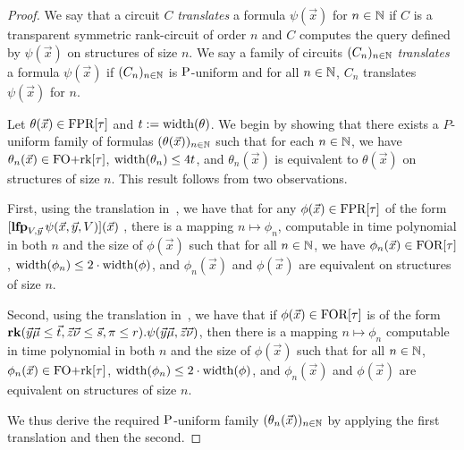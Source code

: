 \documentclass[../paper.tex]{subfiles}
\begin{document}
\begin{proof}
  We say that a circuit $C$ \emph{translates} a formula $\psi(\vec{x})$ for $n
  \in \mathbb{N}$ if $C$ is a transparent symmetric rank-circuit of order $n$ and $C$
  computes the query defined by $\psi(\vec{x})$ on structures of size $n$. We
  say a family of circuits $(C_n)_{n \in \mathbb{N}}$ \emph{translates} a formula
  $\psi (\vec{x})$ if $(C_n)_{n \in \mathbb{N}}$ is $\mathrm{P}$-uniform and for all $n \in
  \mathbb{N}$, $C_n$ translates $\psi(\vec{x})$ for $n$.

  
  Let $\theta(\vec{x}) \in \text{\upshape FPR}[\tau]$ and $t := \mathrm{width} (\theta)$. We begin by
  showing that there exists a $P$-uniform family of formulas
  $(\theta(\vec{x}))_{n \in \mathbb{N}}$ such that for each $n \in \mathbb{N}$, we have
  $\theta_n(\vec{x}) \in \text{\upshape FO+rk}[\tau]$, $\mathrm{width}(\theta_n) \leq 4 t$, and
  $\theta_n(\vec{x})$ is equivalent to $\theta(\vec{x})$ on structures of size
  $n$. This result follows from two observations.

  First, using the translation in~\cite{Dawar09logicswith}, we have that for any
  $\phi(\vec{x}) \in \text{\upshape FPR}[\tau]$ of the form $[\text{\textbf{lfp}}_{V, \vec{y}} \, \psi(\vec{x},
    \vec{y}, V) ](\vec{x})$ , there is a mapping $n \mapsto \phi_n$, computable
  in time polynomial in both $n$ and the size of $\phi(\vec{x})$ such that for
  all $n \in \mathbb{N}$, we have $\phi_n(\vec{x}) \in \text{\upshape FOR}[\tau]$, $\mathrm{width} (\phi_n)
  \leq 2 \cdot \mathrm{width} (\phi)$, and $\phi_n(\vec{x})$ and $\phi(\vec{x})$ are
  equivalent on structures of size $n$.

  Second, using the translation in~\cite{libkin2004elements}, we have that if
  $\phi (\vec{x}) \in \text{\upshape FOR}[\tau]$ is of the form $\text{\textbf{rk}} (\vec{y}\vec{\mu} \leq
  \vec{t}, \vec{z}\vec{\nu} \leq \vec{s}, \pi \leq r) . \psi (\vec{y}\vec{\mu},
  \vec{z} \vec{\nu})$, then there is a mapping $n \mapsto \phi_n$ computable in
  time polynomial in both $n$ and the size of $\phi(\vec{x})$ such that for all
  $n \in \mathbb{N}$, $\phi_n(\vec{x}) \in \text{\upshape FO+rk}[\tau]$, $\mathrm{width}(\phi_n) \leq 2 \cdot
  \mathrm{width}(\phi)$, and $\phi_n(\vec{x})$ and $\phi(\vec{x})$ are equivalent on
  structures of size $n$.

  We thus derive the required $\mathrm{P}$-uniform family $(\theta_n(\vec{x}))_{n \in
    \mathbb{N}}$ by applying the first translation and then the second.


\end{proof}
\end{document}
